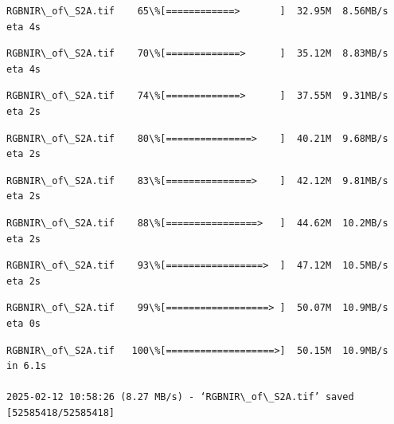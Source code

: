 \documentclass[11pt]{article}
\begin{document}
    \begin{Verbatim}[commandchars=\\\{\}]
 RGBNIR\_of\_S2A.tif    65\%[============>       ]  32.95M  8.56MB/s    eta 4s
    \end{Verbatim}

    \begin{Verbatim}[commandchars=\\\{\}]
 RGBNIR\_of\_S2A.tif    70\%[=============>      ]  35.12M  8.83MB/s    eta 4s
    \end{Verbatim}

    \begin{Verbatim}[commandchars=\\\{\}]
 RGBNIR\_of\_S2A.tif    74\%[=============>      ]  37.55M  9.31MB/s    eta 2s
    \end{Verbatim}

    \begin{Verbatim}[commandchars=\\\{\}]
 RGBNIR\_of\_S2A.tif    80\%[===============>    ]  40.21M  9.68MB/s    eta 2s
    \end{Verbatim}

    \begin{Verbatim}[commandchars=\\\{\}]
 RGBNIR\_of\_S2A.tif    83\%[===============>    ]  42.12M  9.81MB/s    eta 2s
    \end{Verbatim}

    \begin{Verbatim}[commandchars=\\\{\}]
 RGBNIR\_of\_S2A.tif    88\%[================>   ]  44.62M  10.2MB/s    eta 2s
    \end{Verbatim}

    \begin{Verbatim}[commandchars=\\\{\}]
 RGBNIR\_of\_S2A.tif    93\%[=================>  ]  47.12M  10.5MB/s    eta 2s
    \end{Verbatim}

    \begin{Verbatim}[commandchars=\\\{\}]
 RGBNIR\_of\_S2A.tif    99\%[==================> ]  50.07M  10.9MB/s    eta 0s
    \end{Verbatim}

    \begin{Verbatim}[commandchars=\\\{\}]
 RGBNIR\_of\_S2A.tif   100\%[===================>]  50.15M  10.9MB/s    in 6.1s

2025-02-12 10:58:26 (8.27 MB/s) - ‘RGBNIR\_of\_S2A.tif’ saved [52585418/52585418]

    \end{Verbatim}
\end{document}
